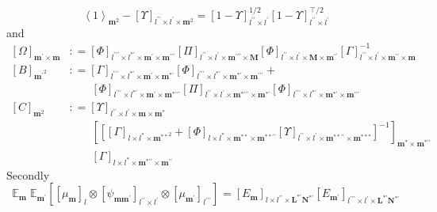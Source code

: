 \documentclass[preprint,12pt]{elsarticle}
\newcommand*{\M}[1]{\ensuremath{#1}\xspace}
\newcommand*{\x}{\times}
\newcommand*{\mi}[1]{\mathbf{#1}}
\newcommand*{\te}[2][]{\left\lbrack{#2}\right\rbrack_{#1}}
\newcommand*{\diag}[2][]{\left\langle{#2}\right\rangle_{#1}}
\newcommand*{\deq}{\M{\mathrel{\mathop:}=}}
\newcommand*{\evt}[3][]{\mathbb{E}_{#3}^{#1}\!#2}
\begin{document}
        \begin{equation*}
            \diag[\mi{m}^{2}]{1} - \te[l^{\prime\prime}\x l^{\prime}\x\mi{m}^{2}]{\Upsilon}
            = \te[l^{\prime\prime}\x l^{\prime}]{1-\Upsilon}^{1/2} \te[l^{\prime\prime}\x l^{\prime}]{1-\Upsilon}^{\intercal/2}
        \end{equation*}
        and
        \begin{equation*}
            \begin{aligned}
                \te[\mi{m^{\prime}\x m}]{\Omega} &\deq 
                \te[l^{\prime\prime\prime}\x l^{*\prime}\x\mi{m^{\prime}}\x\mi{m^{\prime\prime\prime}}]{\Phi}
                \te[l^{\prime\prime}\x l^{\prime}\x\mi{m^{\prime\prime\prime}}\x\mi{M}]{\Pi}
                \te[l^{\prime\prime}\x l^{\prime}\x\mi{M}\x\mi{m^{\prime\prime}}]{\Phi}
                \te[l^{\prime\prime}\x l^{\prime}\x\mi{m^{\prime\prime}}\x\mi{m}]{\Gamma}^{-1} \\
                \te[\mi{m^{\prime}}^{2}]{B} &\deq 
                \te[l^{\prime\prime\prime}\x l^{*\prime}\x\mi{m^{\prime}}\x\mi{m^{*\prime}}]{\Gamma}
                \te[l^{\prime\prime\prime}\x l^{*\prime}\x\mi{m^{*\prime}}\x\mi{m^{\prime\prime\prime}}]{\Phi} + \\
                &\phantom{\deq\ }\te[l^{\prime\prime\prime}\x l^{*\prime}\x\mi{m^{\prime}}\x\mi{m^{*\prime\prime\prime}}]{\Phi}
                \te[l^{\prime\prime}\x l^{\prime}\x\mi{m^{*\prime\prime\prime}}\x\mi{m^{*\prime}}]{\Pi}
                \te[l^{\prime\prime\prime}\x l^{*\prime}\x\mi{m^{*\prime}}\x\mi{m^{\prime\prime\prime}}]{\Phi} \\
                \te[\mi{m}^{2}]{C} &\deq 
                \te[l^{\prime\prime}\x l^{\prime}\x\mi{m}\x\mi{m^{*}}]{\Upsilon} \\
                &\phantom{\deq\ }
                \te[\mi{m^{*}}\x\mi{m^{*\prime\prime}}]{\te[]{\te[l\x l^{*}\x\mi{m^{**}}^{2}]{\Gamma}
                + \te[l\x l^{*}\x\mi{m^{**}}\x\mi{m^{**\prime\prime}}]{\Phi}\te[l^{\prime\prime}\x l^{\prime}\x\mi{m^{**\prime\prime}}\x\mi{m^{***}}]{\Upsilon}}^{-1}} \\
                &\phantom{\deq\ }\te[l\x l^{*}\x\mi{m^{*\prime\prime}}\x\mi{m^{\prime\prime}}]{\Gamma}
            \end{aligned}
        \end{equation*}
        Secondly
        \begin{equation*}
            \evt{\;\evt{\te[]{\te[l]{\mu_{\mi{m}}} \otimes \te[l^{\prime\prime}\x l^{\prime}]{\psi_{\mi{mm^{\prime}}}} \otimes \te[l^{\prime\prime\prime}]{\mu_{\mi{m^{\prime}}}}}}{\mi{m^{\prime}}}}{\mi{m}} = 
            \te[l\x l^{\prime\prime}\x \mi{L^{*\prime}N^{*\prime}}]{E_{\mi{m}}}
            \te[l^{\prime\prime\prime}\x l^{\prime}\x \mi{L^{*\prime}N^{*\prime}}]{E_{\mi{m^{\prime}}}}
        \end{equation*}
\end{document}
